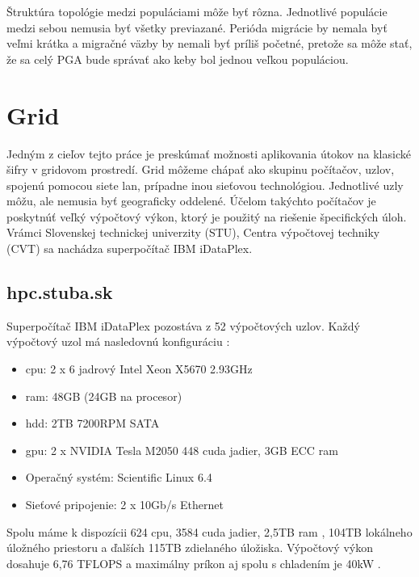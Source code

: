 Štruktúra topológie medzi populáciami môže byť rôzna. Jednotlivé populácie medzi sebou nemusia byť všetky previazané.
Perióda migrácie by nemala byť veľmi krátka a migračné väzby by nemali byť príliš početné, pretože sa môže stať, že sa celý PGA bude správať ako keby bol jednou veľkou populáciou.

\section{Grid}
Jedným z cieľov tejto práce je preskúmať možnosti aplikovania útokov na klasické šifry v gridovom prostredí.
Grid môžeme chápať ako skupinu počítačov, uzlov, spojenú pomocou siete \acrfull{lan}, prípadne inou sieťovou technológiou.
Jednotlivé uzly môžu, ale nemusia byť geograficky oddelené.
Účelom takýchto počítačov je poskytnúť veľký výpočtový výkon, ktorý je použitý na riešenie špecifických úloh.
Vrámci Slovenskej technickej univerzity (STU), Centra výpočtovej techniky (CVT) sa nachádza superpočítač IBM iDataPlex.

\subsection{hpc.stuba.sk}
Superpočítač IBM iDataPlex pozostáva z 52 výpočtových uzlov.
Každý výpočtový uzol má nasledovnú konfiguráciu \cite{hpc}:
\begin{itemize}
\item \acrshort{cpu}: 2 x 6 jadrový Intel Xeon X5670 2.93GHz
\item \acrshort{ram}: 48GB (24GB na procesor)
\item \acrshort{hdd}: 2TB 7200RPM SATA
\item \acrshort{gpu}: 2 x NVIDIA Tesla M2050 448 cuda jadier, 3GB ECC \acrshort{ram}
\item Operačný systém: Scientific Linux 6.4
\item Sieťové pripojenie: 2 x 10Gb/s Ethernet
\end{itemize}
Spolu máme k dispozícii 624 \acrshort{cpu}, 3584 cuda jadier, 2,5TB \acrshort{ram} , 104TB lokálneho úložného priestoru a ďalších 115TB zdielaného úložiska.
Výpočtový výkon dosahuje 6,76 TFLOPS a maximálny príkon aj spolu s chladením je 40kW \cite{hpc}.

